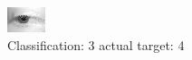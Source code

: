 \begin{figure}[h!]
\begin{center}
\includegraphics[width=0.60\columnwidth]{figures/ID2691_class_3_target_4.png}
\end{center}
\caption{ Classification: 3 actual target: 4}
\label{fig:ID2691_class_3_target_4}
\end{figure}
